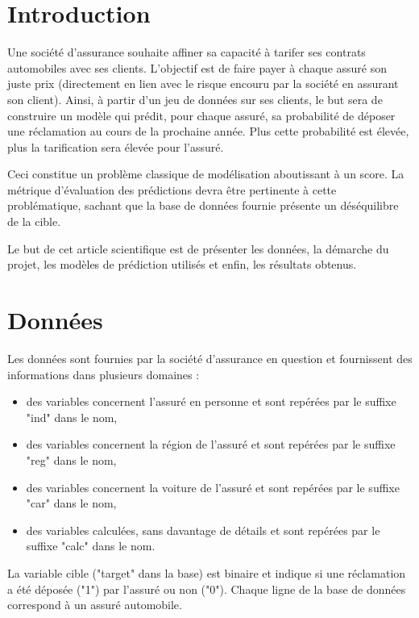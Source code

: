 \documentclass[french]{article}
\begin{document}
\begin{multicols}{2}
\section{Introduction}

Une société d'assurance souhaite affiner sa capacité à tarifer ses contrats automobiles avec ses clients. L'objectif est de faire payer à chaque assuré son \og juste prix \fg{} (directement en lien avec le risque encouru par la société en assurant son client). Ainsi, à partir d'un jeu de données sur ses clients, le but sera de construire un modèle qui prédit, pour chaque assuré, sa probabilité de déposer une réclamation au cours de la prochaine année. Plus cette probabilité est élevée, plus la tarification sera élevée pour l'assuré.

Ceci constitue un problème classique de modélisation aboutissant à un score. La métrique d'évaluation des prédictions devra être pertinente à cette problématique, sachant que la base de données fournie présente un déséquilibre de la cible.

Le but de cet article scientifique est de présenter les données, la démarche du projet, les modèles de prédiction utilisés et enfin, les résultats obtenus.

\section{Données}

Les données sont fournies par la société d'assurance en question et fournissent des informations dans plusieurs domaines :

\begin{itemize}
    \item des variables concernent l'assuré en personne et sont repérées par le suffixe "ind" dans le nom,
    \item des variables concernent la région de l'assuré et sont repérées par le suffixe "reg" dans le nom,
    \item des variables concernent la voiture de l'assuré et sont repérées par le suffixe "car" dans le nom,
    \item des variables calculées, sans davantage de détails et sont repérées par le suffixe "calc" dans le nom.
\end{itemize}

La variable cible ("target" dans la base) est binaire et indique si une réclamation a été déposée ("1") par l'assuré ou non ("0"). Chaque ligne de la base de données correspond à un assuré automobile.


\end{multicols}
\end{document}

